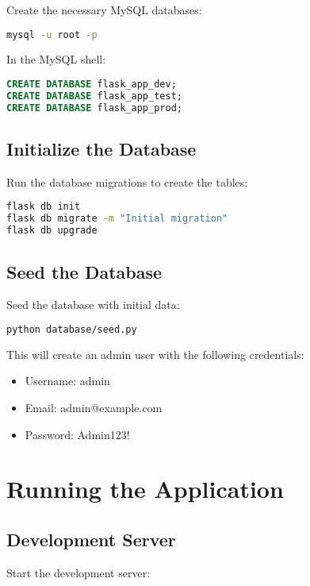 \documentclass{article}
\begin{document}
Create the necessary MySQL databases:

\begin{lstlisting}[language=bash]
mysql -u root -p
\end{lstlisting}

In the MySQL shell:

\begin{lstlisting}[language=sql]
CREATE DATABASE flask_app_dev;
CREATE DATABASE flask_app_test;
CREATE DATABASE flask_app_prod;
\end{lstlisting}

\subsection{Initialize the Database}

Run the database migrations to create the tables:

\begin{lstlisting}[language=bash]
flask db init
flask db migrate -m "Initial migration"
flask db upgrade
\end{lstlisting}

\subsection{Seed the Database}

Seed the database with initial data:

\begin{lstlisting}[language=bash]
python database/seed.py
\end{lstlisting}

This will create an admin user with the following credentials:
\begin{itemize}
    \item Username: admin
    \item Email: admin@example.com
    \item Password: Admin123!
\end{itemize}

\section{Running the Application}

\subsection{Development Server}

Start the development server:
\end{document}
